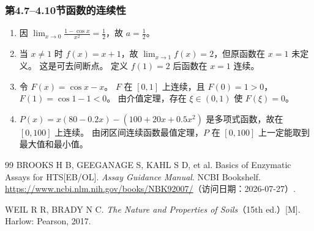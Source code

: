 \documentclass[fontset=fandol]{ctexart}
\begin{document}
\subsubsection*{第4.7--4.10节\quad 函数的连续性}



\begin{enumerate}[label=\textbf{练习\arabic*.},leftmargin=2.2em]

\item 因 $\lim_{x\to0}\frac{1-\cos x}{x^2}=\frac12$，故 $a=\frac12$。

\item 当 $x\neq1$ 时 $f(x)=x+1$，故 $\lim_{x\to1}f(x)=2$，但原函数在 $x=1$ 未定义。 这是可去间断点。 定义 $f(1)=2$ 后函数在 $x=1$ 连续。

\item 令 $F(x)=\cos x-x$。 $F$ 在 $[0,1]$ 上连续，且 $F(0)=1>0$，$F(1)=\cos1-1<0$。 由介值定理，存在 $\xi\in(0,1)$ 使 $F(\xi)=0$。

\item $P(x)=x(80-0.2x)-(100+20x+0.5x^2)$ 是多项式函数，故在 $[0,100]$ 上连续。 由闭区间连续函数最值定理，$P$ 在 $[0,100]$ 上一定能取到最大值和最小值。

\end{enumerate}



\fi




\begin{thebibliography}{99}
 BROOKS H B, GEEGANAGE S, KAHL S D, et al. Basics of Enzymatic Assays for HTS[EB/OL]. \emph{Assay Guidance Manual}. NCBI Bookshelf. \url{https://www.ncbi.nlm.nih.gov/books/NBK92007/}（访问日期：2026-07-27）.

 WEIL R R, BRADY N C. \emph{The Nature and Properties of Soils}（15th ed.）[M]. Harlow: Pearson, 2017.

\end{thebibliography}
\end{document}
